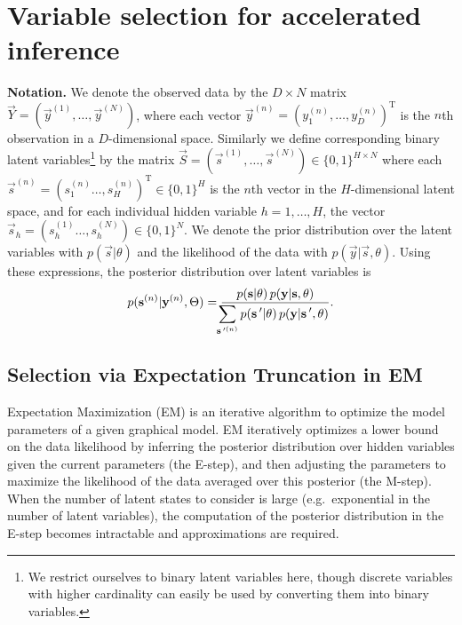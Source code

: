 \section{Variable selection for accelerated inference}
\label{method}
%
\textbf{Notation.}
We denote the observed data by the $D\times N$ matrix $\vec{Y}=(\vec{y}^{(1)}, \dots, \vec{y}^{(N)})$, where each vector $\vec{y}^{(n)} = ( y_1^{(n)}, \dots, y_D^{(n)})^\mathrm{T}$ is the $n$th observation 
in a $D$-dimensional space.
Similarly we define corresponding 
binary latent variables\footnote{We restrict ourselves to binary latent variables here, though
discrete variables with higher cardinality can easily be used by
converting them into binary variables.} 
by the matrix $\vec{S} = (\vec{s}^{(1)}, \dots, \vec{s}^{(N)})\in \{0,1\}^{H \times N}$ 
where each $\vec{s}^{(n)}=(s_1^{(n)}\dots, s^{(n)}_H)^\mathrm{T} \in \{0,1\}^{H}$ is the $n$th vector in the $H$-dimensional latent space,
and for each individual hidden variable $h=1,\dots,H$, the vector $\vec{s}_h=(s_h^{(1)}\dots, s^{(N)}_h)\in \{0,1\}^{N}$. 
%
We denote the prior distribution over the latent variables with $p(\vec{s} | \theta)$ 
and the likelihood of the data with $p(\vec{y} | \vec{s}, \theta)$.
Using these expressions, the posterior distribution over latent variables is 
%
\vspace{-.1cm}
\begin{equation}
\label{eq:post}
p({\mathbf{s}}^{(n)}|{\mathbf{y}}^{(n)},\Theta)  = \frac{p({\mathbf{s}} | \theta) \, p({\mathbf{y}} | {\mathbf{s}}, \theta)}
{\displaystyle\hspace{-1.5mm}\sum_{{\mathbf{s}}\,'^{(n)}} p({\mathbf{s}}\,' | \theta) \, p({\mathbf{y}} | {\mathbf{s}}\,', \theta)}.
\end{equation}
\vspace{-.5cm}

\subsection{Selection via Expectation Truncation in EM}
Expectation Maximization (EM) is an iterative algorithm to optimize the model parameters of a given graphical model.
EM iteratively optimizes a lower bound on the data likelihood by inferring the
posterior distribution over hidden variables given the current parameters (the
E-step), and then adjusting the parameters to maximize the likelihood of the
data averaged over this posterior (the M-step).
%
When the number of latent states to consider is large (e.g.\ exponential in the
number of latent variables), the computation of the posterior distribution in
the E-step becomes intractable and approximations are required.

